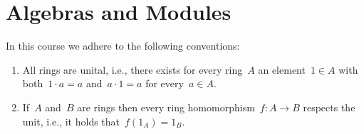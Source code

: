 \chapter{Algebras and Modules}


\begin{conventionnonum}
  In this course we adhere to the following conventions:
  \begin{enumerate}
    \item
      All rings are unital, i.e., there exists for every ring~$A$ an element~$1 \in A$ with both~$1 \cdot a = a$ and~$a \cdot 1 = a$ for every~$a \in A$.
    \item
      If~$A$ and~$B$ are rings then every ring homomorphism~$f \colon A \to B$ respects the unit, i.e., it holds that~$f(1_A) = 1_B$.
  \end{enumerate}
\end{conventionnonum}













